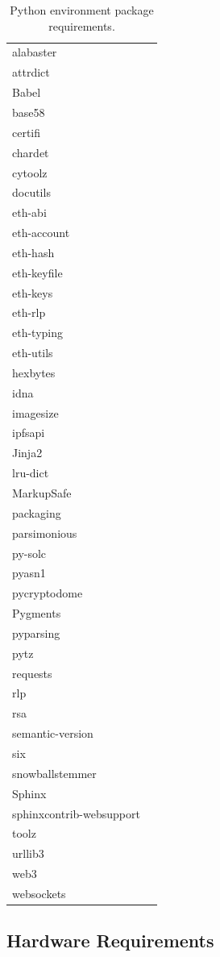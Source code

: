 \documentclass[titlepage]{report}
\begin{document}
\begin{table}
\begin{center}
\begin{tabular}{| l | p{5cm} |}
alabaster\\
attrdict\\
Babel\\
base58\\
certifi\\
chardet\\
cytoolz\\
docutils\\
eth-abi\\
eth-account\\
eth-hash\\
eth-keyfile\\
eth-keys\\
eth-rlp\\
eth-typing\\
eth-utils\\
hexbytes\\
idna\\
imagesize\\
ipfsapi\\
Jinja2\\
lru-dict\\
MarkupSafe\\
packaging\\
parsimonious\\
py-solc\\
pyasn1\\
pycryptodome\\
Pygments\\
pyparsing\\
pytz\\
requests\\
rlp\\
rsa\\
semantic-version\\
six\\
snowballstemmer\\
Sphinx\\
sphinxcontrib-websupport\\
toolz\\
urllib3\\
web3\\
websockets
\end{tabular}
\caption{Python environment package requirements.}
\end{center}
\end{table}

\subsection{Hardware Requirements}
\end{document}
